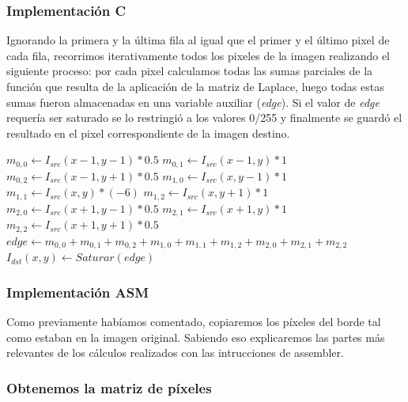 \subsubsection{Implementación C}

Ignorando la primera y la última fila al igual que el primer y el último pixel de cada fila, recorrimos iterativamente todos los pixeles de la imagen realizando el siguiente proceso: por cada pixel calculamos todas las sumas parciales de la función que resulta de la aplicación de la matriz de Laplace, luego todas estas sumas fueron almacenadas en una variable auxiliar (\textit{edge}). Si el valor de \textit{edge} requería ser saturado se lo restringió a los valores 0/255 y finalmente se guardó el resultado en el pixel correspondiente de la imagen destino.

\begin{algorithm}[H]
  \begin{algorithmic}[1]
			  \STATE $m_{0,0} \gets I_{src}(x-1,y-1)*0.5$
			  \STATE $m_{0,1} \gets I_{src}(x-1,y)*1$
			  \STATE $m_{0,2} \gets I_{src}(x-1,y+1)*0.5$
			  \STATE $m_{1,0} \gets I_{src}(x,y-1)*1$
			  \STATE $m_{1,1} \gets I_{src}(x,y)*(-6)$
			  \STATE $m_{1,2} \gets I_{src}(x,y+1)*1$
			  \STATE $m_{2,0} \gets I_{src}(x+1,y-1)*0.5$
			  \STATE $m_{2,1} \gets I_{src}(x+1,y)*1$
			  \STATE $m_{2,2} \gets I_{src}(x+1,y+1)*0.5$
			  \STATE $edge \gets m_{0,0}+m_{0,1}+m_{0,2}+m_{1,0}+m_{1,1}+m_{1,2}+m_{2,0}+m_{2,1}+m_{2,2}$
			  \STATE $I_{dst}(x,y) \gets Saturar(edge)$
			\ENDFOR
		 \ENDFOR
  \end{algorithmic}
  \caption{$edge (I_{src}, I_{dst})$}
  \label{alg:edge}
\end{algorithm}

\subsubsection{Implementación ASM}

Como previamente habíamos comentado, copiaremos los píxeles del borde tal como estaban en la imagen original.
Sabiendo eso explicaremos las partes más relevantes de los cálculos realizados con las intrucciones de assembler.

\subsubsection*{Obtenemos la matriz de píxeles}

